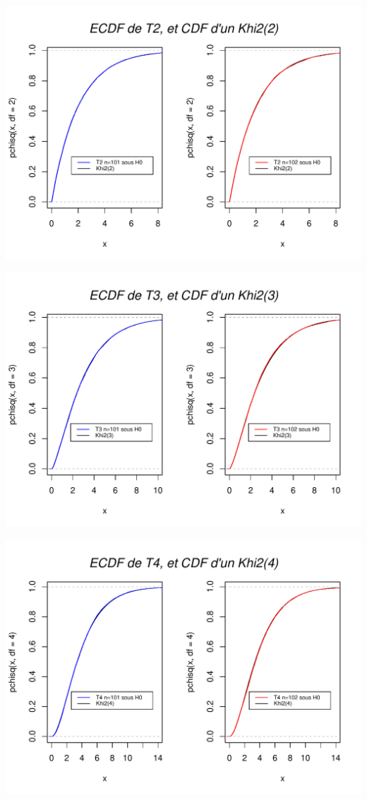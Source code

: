 \documentclass[12pt,a4paper]{article}
\begin{document}
\begin{center}
\includegraphics[scale=0.9]{ECDF2.pdf}
\end{center}

\begin{center}
\includegraphics[scale=0.9]{ECDF3.pdf}
\end{center}

\begin{center}
\includegraphics[scale=0.9]{ECDF4.pdf}
\end{center}
\end{document}
